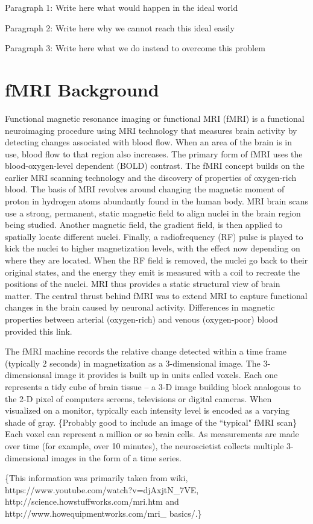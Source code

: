 
{\color{red}Paragraph 1: Write here what would happen in the ideal world}

{\color{red}Paragraph 2: Write here why we cannot reach this ideal easily}

{\color{red}Paragraph 3: Write here what we do instead to overcome this problem}

\section{fMRI Background}

{\color{blue}

Functional magnetic resonance imaging or functional MRI (fMRI) is a functional
neuroimaging procedure using MRI technology that measures brain activity by
detecting changes associated with blood flow.
When an area of the brain is in use, blood flow to that region also increases.
The primary form of fMRI uses the blood-oxygen-level dependent (BOLD) contrast.
The fMRI concept builds on the earlier MRI scanning technology and the discovery
of properties of 
oxygen-rich blood. 
The basis of MRI revolves around changing the magnetic moment of proton
in hydrogen atoms abundantly found in the human body.
MRI brain scans use a strong, permanent, static magnetic field to align nuclei
in the brain region being studied. 
Another magnetic field, the gradient field, is then applied to spatially locate
different nuclei. 
Finally, a radiofrequency (RF) pulse is played to kick the nuclei to higher
magnetization levels, with the effect now depending on where they are located.
When the RF field is removed, the nuclei go back to their original states, and
the energy they emit is measured with a coil to recreate the positions of the
nuclei. MRI thus provides a static structural view of brain matter. The central
thrust behind fMRI was to extend MRI to capture functional changes in the brain
caused by neuronal activity. Differences in magnetic properties between arterial
(oxygen-rich) and venous (oxygen-poor) blood provided this link.

The fMRI machine records the relative change detected within a time frame
(typically 2 seconds) in magnetization as a 3-dimensional image. The
3-dimensionsal image it provides is built up in units called voxels. Each one
represents a tidy cube of brain tissue -- a 3-D image building block analogous
to the 2-D pixel of computers screens, televisions or digital cameras. 
When visualized on a monitor, typically each intensity level is encoded as a
varying shade of gray. \{Probably good to include an
image of the ``typical" fMRI scan\}
Each voxel can represent a million or so brain cells.
As measurements are made over time (for example, over 10 minutes), the
neuroscietist collects multiple 3-dimensional images in the 
form of a time series. 

\{This information was primarily taken from wiki,
https://www.youtube.com/watch?v=djAxjtN\_7VE,
http://science.howstuffworks.com/mri.htm and
http://www.howequipmentworks.com/mri\_
basics/.\}
}


